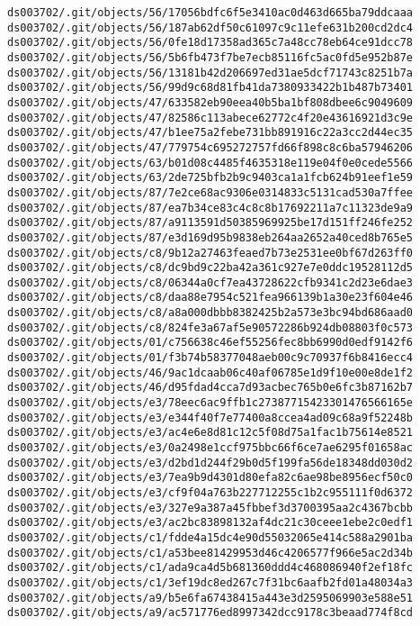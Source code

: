 \documentclass[11pt]{article}
\begin{document}
\begin{Verbatim}[commandchars=\\\{\}]
ds003702/.git/objects/56/17056bdfc6f5e3410ac0d463d665ba79ddcaaa
ds003702/.git/objects/56/187ab62df50c61097c9c11efe631b200cd2dc4
ds003702/.git/objects/56/0fe18d17358ad365c7a48cc78eb64ce91dcc78
ds003702/.git/objects/56/5b6fb473f7be7ecb85116fc5ac0fd5e952b87e
ds003702/.git/objects/56/13181b42d206697ed31ae5dcf71743c8251b7a
ds003702/.git/objects/56/99d9c68d81fb41da7380933422b1b487b73401
ds003702/.git/objects/47/633582eb90eea40b5ba1bf808dbee6c9049609
ds003702/.git/objects/47/82586c113abece62772c4f20e43616921d3c9e
ds003702/.git/objects/47/b1ee75a2febe731bb891916c22a3cc2d44ec35
ds003702/.git/objects/47/779754c695272757fd66f898c8c6ba57946206
ds003702/.git/objects/63/b01d08c4485f4635318e119e04f0e0cede5566
ds003702/.git/objects/63/2de725bfb2b9c9403ca1a1fcb624b91eef1e59
ds003702/.git/objects/87/7e2ce68ac9306e0314833c5131cad530a7ffee
ds003702/.git/objects/87/ea7b34ce83c4c8c8b17692211a7c11323de9a9
ds003702/.git/objects/87/a9113591d50385969925be17d151ff246fe252
ds003702/.git/objects/87/e3d169d95b9838eb264aa2652a40ced8b765e5
ds003702/.git/objects/c8/9b12a27463feaed7b73e2531ee0bf67d263ff0
ds003702/.git/objects/c8/dc9bd9c22ba42a361c927e7e0ddc19528112d5
ds003702/.git/objects/c8/06344a0cf7ea43728622cfb9341c2d23e6dae3
ds003702/.git/objects/c8/daa88e7954c521fea966139b1a30e23f604e46
ds003702/.git/objects/c8/a8a000dbbb8382425b2a573e3bc94bd686aad0
ds003702/.git/objects/c8/824fe3a67af5e90572286b924db08803f0c573
ds003702/.git/objects/01/c756638c46ef55256fec8bb6990d0edf9142f6
ds003702/.git/objects/01/f3b74b58377048aeb00c9c70937f6b8416ecc4
ds003702/.git/objects/46/9ac1dcaab06c40af06785e1d9f10e00e8de1f2
ds003702/.git/objects/46/d95fdad4cca7d93acbec765b0e6fc3b87162b7
ds003702/.git/objects/e3/78eec6ac9ffb1c27387715423301476566165e
ds003702/.git/objects/e3/e344f40f7e77400a8ccea4ad09c68a9f52248b
ds003702/.git/objects/e3/ac4e6e8d81c12c5f08d75a1fac1b75614e8521
ds003702/.git/objects/e3/0a2498e1ccf975bbc66f6ce7ae6295f01658ac
ds003702/.git/objects/e3/d2bd1d244f29b0d5f199fa56de18348dd030d2
ds003702/.git/objects/e3/7ea9b9d4301d80efa82c6ae98be8956ecf50c0
ds003702/.git/objects/e3/cf9f04a763b227712255c1b2c955111f0d6372
ds003702/.git/objects/e3/327e9a387a45fbbef3d3700395aa2c4367bcbb
ds003702/.git/objects/e3/ac2bc83898132af4dc21c30ceee1ebe2c0edf1
ds003702/.git/objects/c1/fdde4a15dc4e90d55032065e414c588a2901ba
ds003702/.git/objects/c1/a53bee81429953d46c4206577f966e5ac2d34b
ds003702/.git/objects/c1/ada9ca4d5b681360ddd4c468086940f2ef18fc
ds003702/.git/objects/c1/3ef19dc8ed267c7f31bc6aafb2fd01a48034a3
ds003702/.git/objects/a9/b5e6fa67438415a443e3d2595069903e588e51
ds003702/.git/objects/a9/ac571776ed8997342dcc9178c3beaad774f8cd

\end{Verbatim}
\end{document}
